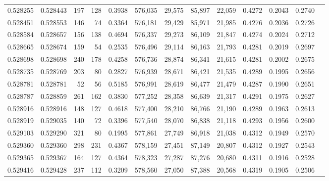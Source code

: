 \begin{tabular}{rrrrrrrrrrrrr}
0.528255 & 0.528443 &   197 &   128 &                                     0.3938 & 576,035 &  29,575 &  85,897 &  22,059 & 0.4272 & 0.2043 & 0.2740 \\
0.528451 & 0.528553 &   146 &    74 &                                     0.3364 & 576,181 &  29,429 &  85,971 &  21,985 & 0.4276 & 0.2036 & 0.2726 \\
0.528584 & 0.528657 &   156 &   138 &                                     0.4694 & 576,337 &  29,273 &  86,109 &  21,847 & 0.4274 & 0.2024 & 0.2712 \\
0.528665 & 0.528674 &   159 &    54 &                                     0.2535 & 576,496 &  29,114 &  86,163 &  21,793 & 0.4281 & 0.2019 & 0.2697 \\
0.528698 & 0.528698 &   240 &   178 &                                     0.4258 & 576,736 &  28,874 &  86,341 &  21,615 & 0.4281 & 0.2002 & 0.2675 \\
0.528735 & 0.528769 &   203 &    80 &                                     0.2827 & 576,939 &  28,671 &  86,421 &  21,535 & 0.4289 & 0.1995 & 0.2656 \\
0.528781 & 0.528781 &    52 &    56 &                                     0.5185 & 576,991 &  28,619 &  86,477 &  21,479 & 0.4287 & 0.1990 & 0.2651 \\
0.528787 & 0.528859 &   261 &   162 &                                     0.3830 & 577,252 &  28,358 &  86,639 &  21,317 & 0.4291 & 0.1975 & 0.2627 \\
0.528916 & 0.528916 &   148 &   127 &                                     0.4618 & 577,400 &  28,210 &  86,766 &  21,190 & 0.4289 & 0.1963 & 0.2613 \\
0.528919 & 0.529035 &   140 &    72 &                                     0.3396 & 577,540 &  28,070 &  86,838 &  21,118 & 0.4293 & 0.1956 & 0.2600 \\
0.529103 & 0.529290 &   321 &    80 &                                     0.1995 & 577,861 &  27,749 &  86,918 &  21,038 & 0.4312 & 0.1949 & 0.2570 \\
0.529360 & 0.529360 &   298 &   231 &                                     0.4367 & 578,159 &  27,451 &  87,149 &  20,807 & 0.4312 & 0.1927 & 0.2543 \\
0.529365 & 0.529367 &   164 &   127 &                                     0.4364 & 578,323 &  27,287 &  87,276 &  20,680 & 0.4311 & 0.1916 & 0.2528 \\
0.529416 & 0.529428 &   237 &   112 &                                     0.3209 & 578,560 &  27,050 &  87,388 &  20,568 & 0.4319 & 0.1905 & 0.2506 \\

\end{tabular}
